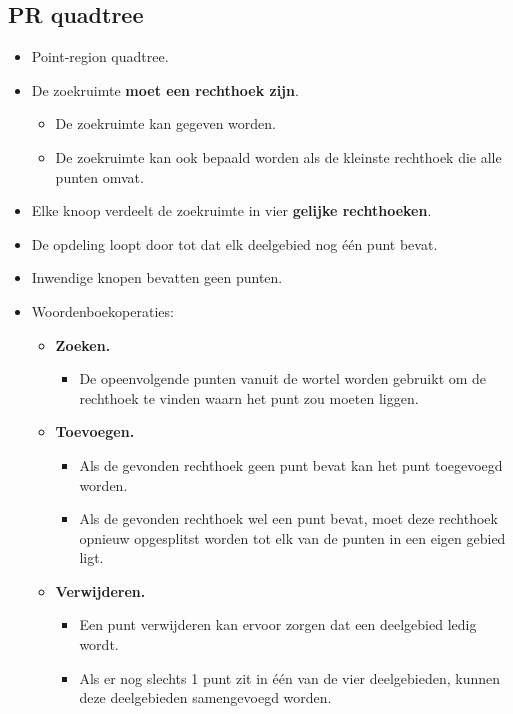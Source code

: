 \subsection{PR quadtree}
\begin{itemize}
    \item Point-region quadtree.
    \item De zoekruimte \textbf{moet een rechthoek zijn}.
    \begin{itemize}
        \item De zoekruimte kan gegeven worden.
        \item De zoekruimte kan ook bepaald worden als de kleinste rechthoek die alle punten omvat.
    \end{itemize}
    \item Elke knoop verdeelt de zoekruimte in vier \textbf{gelijke rechthoeken}.
    \item De opdeling loopt door tot dat elk deelgebied nog één punt bevat.
    \item Inwendige knopen bevatten geen punten.
    \item Woordenboekoperaties:
    \begin{itemize}
        \item \textbf{Zoeken.}
        \begin{itemize}
            \item De opeenvolgende punten vanuit de wortel worden gebruikt om de rechthoek te vinden waarn het punt zou moeten liggen.
        \end{itemize}
        \item \textbf{Toevoegen.}
        \begin{itemize}
            \item Als de gevonden rechthoek geen punt bevat kan het punt toegevoegd worden.
            \item Als de gevonden rechthoek wel een punt bevat, moet deze rechthoek opnieuw opgesplitst worden tot elk van de punten in een eigen gebied ligt.
        \end{itemize}
        \item \textbf{Verwijderen.}
        \begin{itemize}
            \item Een punt verwijderen kan ervoor zorgen dat een deelgebied ledig wordt.
            \item Als er nog slechts 1 punt zit in één van de vier deelgebieden, kunnen deze deelgebieden samengevoegd worden.
        \end{itemize}

\end{itemize}
\end{itemize}
